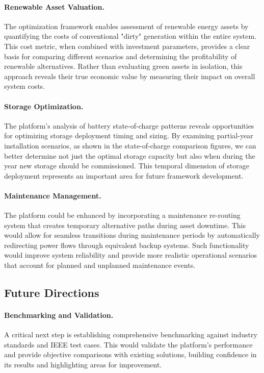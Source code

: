 \paragraph{Renewable Asset Valuation.}
The optimization framework enables assessment of renewable energy assets by quantifying the costs of 
conventional "dirty" generation within the entire system. This cost metric, when combined with investment 
parameters, provides a clear basis for comparing different scenarios and determining the profitability of 
renewable alternatives. Rather than evaluating green assets in isolation, this approach reveals their true 
economic value by measuring their impact on overall system costs.

\paragraph{Storage Optimization.}
The platform's analysis of battery state-of-charge patterns reveals opportunities for optimizing 
storage deployment timing and sizing. By examining partial-year installation scenarios, as shown in the 
state-of-charge comparison figures, we can better determine not just the optimal storage capacity but also 
when during the year new storage should be commissioned. This temporal dimension of storage deployment 
represents an important area for future framework development.

\paragraph{Maintenance Management.}
The platform could be enhanced by incorporating a maintenance re-routing system that creates temporary 
alternative paths during asset downtime. This would allow for seamless transitions during maintenance periods 
by automatically redirecting power flows through equivalent backup systems. Such functionality would improve 
system reliability and provide more realistic operational scenarios that account for planned and unplanned 
maintenance events.


\subsection{Future Directions}
\label{sec:future_directions}

\paragraph{Benchmarking and Validation.}
A critical next step is establishing comprehensive benchmarking 
against industry standards and IEEE test cases. This would validate the platform's performance and provide 
objective comparisons with existing solutions, building confidence in its results and highlighting areas 
for improvement.

